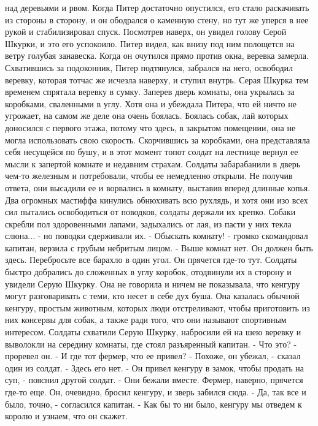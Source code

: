 над деревьями и рвом. Когда Питер достаточно опустился, его стало 
раскачивать из стороны в сторону, и он ободрался о каменную стену, но 
тут же уперся в нее рукой и стабилизировал спуск. Посмотрев наверх, он 
увидел голову Серой Шкурки, и это его успокоило.
    Питер видел, как внизу под ним полощется на ветру голубая 
занавеска. Когда он очутился прямо против окна, веревка замерла. 
Схватившись за подоконник, Питер подтянулся, забрался на него, 
освободил веревку, которая тотчас же исчезла наверху, и ступил внутрь.
    Серая Шкурка тем временем спрятала веревку в сумку. Заперев дверь 
комнаты, она укрылась за коробками, сваленными в углу. Хотя она и 
убеждала Питера, что ей ничто не угрожает, на самом же деле она очень 
боялась. Боялась собак, лай которых доносился с первого этажа, потому 
что здесь, в закрытом помещении, она не могла использовать свою 
скорость. Скорчившись за коробками, она представляла себя несущейся по 
бушу, и в этот момент топот солдат на лестнице вернул ее мысли к 
запертой комнате и недавним страхам.
    Солдаты забарабанили в дверь чем-то железным и потребовали, чтобы 
ее немедленно открыли. Не получив ответа, они высадили ее и ворвались 
в комнату, выставив вперед длинные копья. Два огромных мастиффа 
кинулись обнюхивать всю рухлядь, и хотя они изо всех сил пытались 
освободиться от поводков, солдаты держали их крепко. Собаки скребли 
пол здоровенными лапами, задыхались от лая, из пасти у них текла 
слюна... - но поводки сдерживали их.
    - Обыскать комнату! - громко скомандовал капитан, верзила с грубым 
небритым лицом. - Выше комнат нет. Он должен быть здесь. Перебросьте 
все барахло в один угол. Он прячется где-то тут.
    Солдаты быстро добрались до сложенных в углу коробок, отодвинули 
их в сторону и увидели Серую Шкурку. Она не говорила и ничем не 
показывала, что кенгуру могут разговаривать с теми, кто несет в себе 
дух буша. Она казалась обычной кенгуру, простым животным, которых люди 
отстреливают, чтобы приготовить из них консервы для собак, а также 
ради того, что они называют спортивным интересом.
    Солдаты схватили Серую Шкурку, набросили ей на шею веревку и 
выволокли на середину комнаты, где стоял разъяренный капитан.
    - Что это? - проревел он. - И где тот фермер, что ее привел?
    - Похоже, он убежал, - сказал один из солдат. - Здесь его нет.
    - Он привел кенгуру в замок, чтобы продать на суп, - пояснил 
другой солдат. - Они бежали вместе. Фермер, наверно, прячется где-то 
еще. Он, очевидно, бросил кенгуру, и зверь забился сюда.
    - Да, так все и было, точно, - согласился капитан. - Как бы то ни 
было, кенгуру мы отведем к королю и узнаем, что он скажет.
